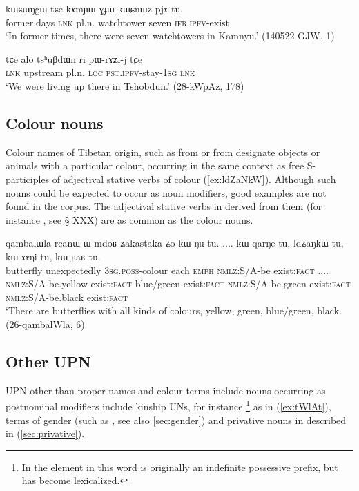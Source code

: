 \begin{exe}
\ex \label{ex:kAmYW.GJW}
 \gll  kɯɕɯŋgɯ tɕe kɤmɲɯ ɣɟɯ kɯɕnɯz pjɤ-tu. \\
 former.days \textsc{lnk} pl.n. watchtower  seven \textsc{ifr}.\textsc{ipfv}-exist \\
 \glt `In former times, there were seven watchtowers in Kamnyu.' (140522 GJW, 1)
\end{exe}

\begin{exe}
\ex \label{ex:tshuBdWn.ri}
 \gll  tɕe alo tsʰuβdɯn ri pɯ-rɤʑi-j tɕe \\
 \textsc{lnk} upstream pl.n. \textsc{loc} \textsc{pst}.\textsc{ipfv}-stay-\textsc{1sg} \textsc{lnk} \\
 \glt `We were living up there in Tshobdun.' (28-kWpAz, 178)
\end{exe}

\subsection{Colour nouns} \label{sec:tibetan.colours}
Colour names of Tibetan origin, such as  from  or  from  designate objects or animals with a particular colour, occurring in the same context as free S-participles of adjectival stative verbs of colour (\ref{ex:ldZaNkW}). Although such nouns could be expected to occur as noun modifiers, good examples are not found in the corpus. The adjectival stative verbs in  derived from them (for instance , see § XXX) are as common as the colour nouns.
 
\begin{exe}
\ex \label{ex:ldZaNkW}
 \gll qambalɯla rcanɯ ɯ-mdoʁ ʑakastaka ʑo kɯ-ŋu tu. .... kɯ-qarŋe tu, ldʑaŋkɯ tu, kɯ-ɤrŋi tu, kɯ-ɲaʁ tu. \\
 butterfly unexpectedly \textsc{3sg}.\textsc{poss}-colour each \textsc{emph} \textsc{nmlz}:S/A-be exist:\textsc{fact} .... \textsc{nmlz}:S/A-be.yellow exist:\textsc{fact} blue/green exist:\textsc{fact}  \textsc{nmlz}:S/A-be.green exist:\textsc{fact} \textsc{nmlz}:S/A-be.black exist:\textsc{fact}\\
 \glt `There are butterflies with all kinds of colours, yellow, green, blue/green, black. (26-qambalWla, 6)
\end{exe}

\subsection{Other UPN}   \label{sec:other.upn}
UPN other than proper names and colour terms include nouns occurring as postnominal modifiers include kinship UNs, for instance \footnote{In  the  element in this word is originally an indefinite possessive prefix, but has become lexicalized.} as in (\ref{ex:tWlAt}), terms of gender (such as , see also \ref{sec:gender}) and  privative nouns in  described in (\ref{sec:privative}). 

